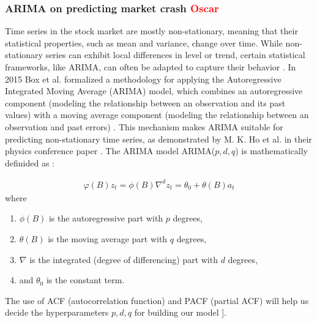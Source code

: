 \documentclass[12pt, letterpaper]{article}
\begin{document}
    \subsubsection*{ARIMA on predicting market crash \textcolor{red}{Oscar}}
Time series in the stock market are mostly non-stationary, meaning that their statistical properties, such as mean and variance, change over time. While non-stationary series can exhibit local differences in level or trend, certain statistical frameworks, like ARIMA, can often be adapted to capture their behavior \cite{ho2021}.
In 2015 Box et al. formalized a methodology for applying the Autoregressive Integrated Moving Average (ARIMA) model, which combines an autoregressive component (modeling the relationship between an observation and its past values) with a moving average component (modeling the relationship between an observation and past errors) \cite{box2015}.
This mechanism makes ARIMA suitable for predicting non-stationary time series, as demonstrated by M. K. Ho et al. in their physics conference paper \cite{ho2021}.
The ARIMA model ARIMA($p,d,q$) is mathematically definided as \cite{box2015}:
 {\small
\begin{align*}
    \varphi (B) z_t = \phi (B)\nabla^d z_t = \theta_0 + \theta (B)a_t
\end{align*}
where
\begin{enumerate}[label=\arabic*.]
    \item $\phi(B)$ is the autoregressive part with $p$ degrees,
    \item $\theta (B)$ is the moving average part with $q$ degrees,
    \item $\nabla$ is the integrated (degree of differencing) part with $d$ degrees,
    \item and $\theta_0$ is the constant term.
\end{enumerate}
}
    The use of ACF (autocorrelation function) and PACF (partial ACF) will help us decide the hyperparameters $p, d, q$ for building our model \cite{hyndman2018}].
   
\end{document}
